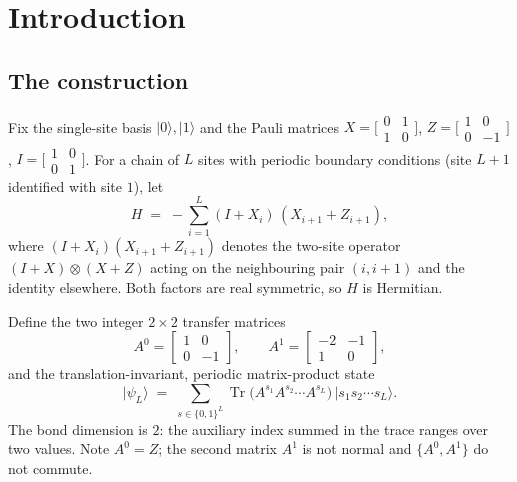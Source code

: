 \documentclass[11pt]{amsart}
\newcommand{\Tr}{\operatorname{Tr}}
\newcommand{\ket}[1]{\lvert #1 \rangle}
\newcommand{\psiL}{\ket{\psi_L}}
\theoremstyle{plain}
\theoremstyle{definition}
\theoremstyle{remark}
\begin{document}
\maketitle

\section{Introduction}\label{sec:intro}

\subsection{The construction}\label{ssec:construction}
Fix the single-site basis $\ket0,\ket1$ and the Pauli matrices
$X=\bigl[\begin{smallmatrix}0&1\\1&0\end{smallmatrix}\bigr]$,
$Z=\bigl[\begin{smallmatrix}1&0\\0&-1\end{smallmatrix}\bigr]$,
$I=\bigl[\begin{smallmatrix}1&0\\0&1\end{smallmatrix}\bigr]$. For a chain of
$L$ sites with periodic boundary conditions (site $L+1$ identified with site
$1$), let
\begin{equation}\label{eq:H}
H \;=\; -\sum_{i=1}^{L} (I+X_i)\,(X_{i+1}+Z_{i+1}),
\end{equation}
where $(I+X_i)(X_{i+1}+Z_{i+1})$ denotes the two-site operator
$(I+X)\otimes(X+Z)$ acting on the neighbouring pair $(i,i+1)$ and the
identity elsewhere. Both factors are real symmetric, so $H$ is Hermitian.

Define the two integer $2\times2$ transfer matrices
\begin{equation}\label{eq:A}
A^0=\begin{bmatrix}1&0\\0&-1\end{bmatrix},
\qquad
A^1=\begin{bmatrix}-2&-1\\1&0\end{bmatrix},
\end{equation}
and the translation-invariant, periodic matrix-product state
\begin{equation}\label{eq:mps}
\psiL \;=\; \sum_{s\in\{0,1\}^L}
\Tr\!\bigl(A^{s_1}A^{s_2}\cdots A^{s_L}\bigr)\,
\ket{s_1 s_2 \cdots s_L}.
\end{equation}
The bond dimension is $2$: the auxiliary index summed in the trace ranges
over two values. Note $A^0=Z$; the second matrix $A^1$ is not normal and
$\{A^0,A^1\}$ do not commute.
\end{document}
